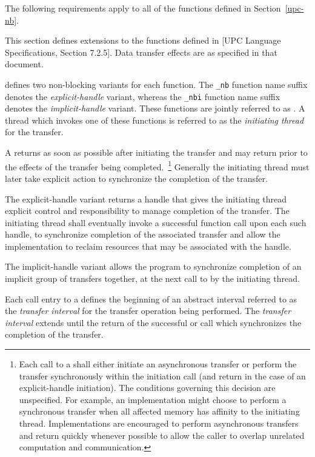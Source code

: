 \np The following requirements apply to all of the functions defined
in Section~\ref{upc-nb}.

\np This section defines extensions to the \memstar functions defined in
[UPC Language Specifications, Section 7.2.5]. Data transfer effects are
as specified in that document.

\np \nbheader defines two non-blocking variants for each \memstar function.
The {\tt \_nb} function name suffix denotes the {\em explicit-handle} variant, 
whereas the {\tt \_nbi} function name suffix denotes the {\em implicit-handle} variant.
These functions are jointly referred to as {\em \TIFs}. 
A thread which invokes one of these functions is referred to
as the {\em initiating thread} for the transfer.

\np A \TIF returns as soon as possible after
initiating the transfer and may return prior to the effects of the transfer being
completed.~\footnote{
Each call to a \TIF shall either initiate an asynchronous transfer or
perform the transfer synchronously within the initiation call 
(and return \complete in the case of an explicit-handle initiation).
The conditions governing this decision are unspecified.
For example, an implementation might choose to
perform a synchronous transfer when all affected memory has affinity to the initiating thread.
Implementations are encouraged to perform asynchronous transfers and
return quickly whenever possible to allow the caller to overlap unrelated 
computation and communication.
}
Generally the initiating thread must later take explicit action to 
synchronize the completion of the transfer.

\np The explicit-handle variant returns a handle that gives the initiating thread explicit
control and responsibility to manage completion of the transfer.  
The initiating thread shall eventually invoke a successful \sync function call
upon each such handle, to synchronize completion of the associated transfer
and allow the implementation to reclaim resources that may be associated with the handle.

\np The implicit-handle variant allows the program to synchronize
completion of an implicit group of transfers together, at the next call to \synci
by the initiating thread.

\np Each call entry to a \TIF defines the beginning of an abstract interval referred to 
as the {\em transfer interval} for the transfer operation being performed. 
The {\em transfer interval} extends until the return of the successful \sync or \synci call
which synchronizes the completion of the transfer.

